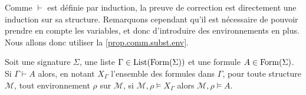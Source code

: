 Comme $\vdash$ est définie par induction, la preuve de correction est
directement une induction sur sa structure. Remarquons cependant qu'il est
nécessaire de pouvoir prendre en compte les variables, et donc d'introduire des
environnements en plus. Nous allons donc utiliser la \cref{prop.comm.subst.env}.

\begin{theorem}[Correction]
  Soit une signature $\Sigma$, une liste $\Gamma\in\operatorname{List}(\operatorname{Form}(\Sigma))$ et
  une formule $A\in\operatorname{Form}(\Sigma)$. Si $\Gamma\vdash A$ alors, en notant
  $X_\Gamma$ l'ensemble des formules dans $\Gamma$, pour toute structure
  $\mathcal M$, tout environnement $\rho$ sur $\mathcal M$, si
  $\mathcal M,\rho\models X_\Gamma$ alors $\mathcal M,\rho\models A$.
\end{theorem}

